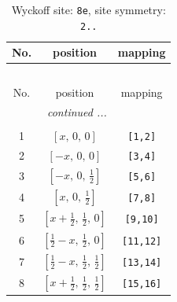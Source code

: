\documentclass[fleqn,8pt]{jsarticle}
\begin{document}
\renewcommand{\arraystretch}{1.2}
\begin{longtable}{ccc}
\caption{Wyckoff site: {\tt 8e}, site symmetry: {\tt 2..}}
 \\
 \hline \hline
No. & position & mapping \\ \hline \endfirsthead

\multicolumn{2}{l}{\tablename\ \thetable{}} \\
 \hline \hline
No. & position & mapping \\ \hline \endhead

 \hline \hline
\multicolumn{2}{r}{\footnotesize\it continued ...} \\ \endfoot

 \hline \hline
\multicolumn{2}{r}{} \\ \endlastfoot

1 & $\left[ x,\, 0,\, 0 \right]$ & {\tt [1,2]} \\ \hline
2 & $\left[ - x,\, 0,\, 0 \right]$ & {\tt [3,4]} \\ \hline
3 & $\left[ - x,\, 0,\, \frac{1}{2} \right]$ & {\tt [5,6]} \\ \hline
4 & $\left[ x,\, 0,\, \frac{1}{2} \right]$ & {\tt [7,8]} \\ \hline
5 & $\left[ x + \frac{1}{2},\, \frac{1}{2},\, 0 \right]$ & {\tt [9,10]} \\ \hline
6 & $\left[ \frac{1}{2} - x,\, \frac{1}{2},\, 0 \right]$ & {\tt [11,12]} \\ \hline
7 & $\left[ \frac{1}{2} - x,\, \frac{1}{2},\, \frac{1}{2} \right]$ & {\tt [13,14]} \\ \hline
8 & $\left[ x + \frac{1}{2},\, \frac{1}{2},\, \frac{1}{2} \right]$ & {\tt [15,16]} \\
\end{longtable}
\renewcommand{\arraystretch}{1.2}
\end{document}
